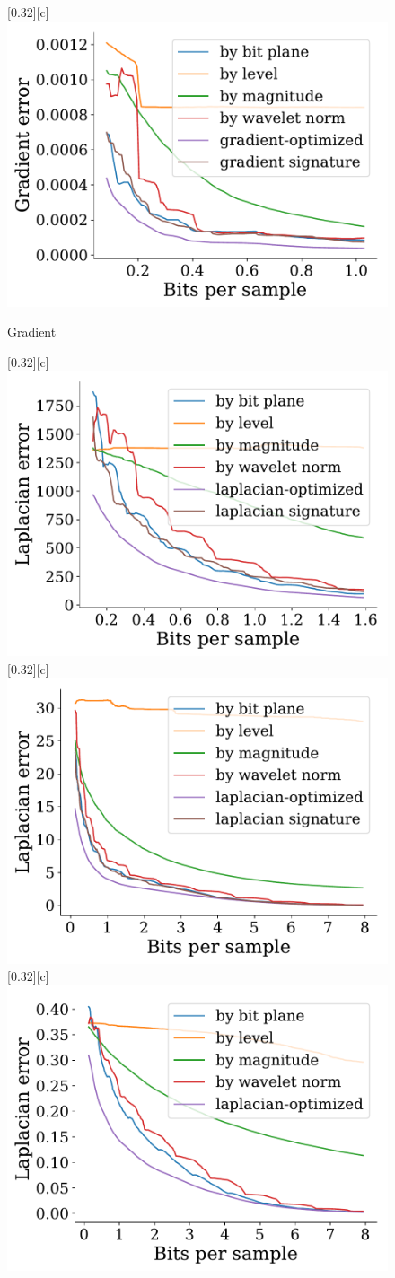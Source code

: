 \documentclass{article}
\begin{document}
\begin{figure}[htb]
        [0.32\linewidth][c]{%
                \includegraphics[width=0.3\linewidth]{img/supplementary/gradient-optimized-karfs}}
        \caption{Gradient}
\end{figure}


\begin{figure}[htb]
        \centering
        [0.32\linewidth][c]{%
               \includegraphics[width=0.3\linewidth]{img/supplementary/laplacian-optimized-flame}}
        [0.32\linewidth][c]{%
               \includegraphics[width=0.3\linewidth]{img/supplementary/laplacian-optimized-csafe}}
        [0.32\linewidth][c]{%
               \includegraphics[width=0.3\linewidth]{img/supplementary/laplacian-optimized-enzo-v}}

\end{figure}
\end{document}
